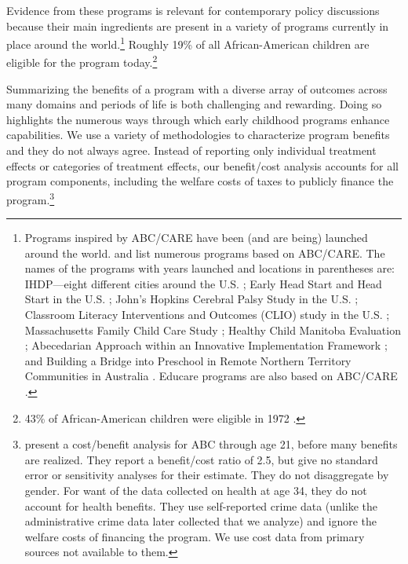 Evidence from these programs is relevant for contemporary policy discussions because their main ingredients are present in a variety of programs currently in place around the world.\footnote{Programs inspired by ABC/CARE have been (and are being) launched around the world. \citet{Sparling_2010_Highlights} and \citet{Ramey_Ramey_Lanzi_2014_Interventions} list numerous programs based on ABC/CARE. The names of the programs with years launched and locations in parentheses are: IHDP---eight different cities around the U.S. \citep{Spiker-etal_1997_Helping}; Early Head Start and Head Start in the U.S. \citep{Schneider_McDonald-eds_2007_Scale-Up_Vol-1}; John's Hopkins Cerebral Palsy Study in the U.S. \citep{Sparling_2010_Highlights}; Classroom Literacy Interventions and Outcomes (CLIO) study in the U.S. \citep{Sparling_2010_Highlights}; Massachusetts Family Child Care Study \citep{Collins_etal_2010_Massachusetts-Study}; Healthy Child Manitoba Evaluation \citep{Healthy_Child_Manitoba_2015_Starting-Early}; Abecedarian Approach within an Innovative Implementation Framework \citep{Jensen_Nielsen_2016_ABC-Programme-Pilot}; and Building a Bridge into Preschool in Remote Northern Territory Communities in Australia \citep{UMonash_Dataset_2015_URL}. Educare programs are also based on ABC/CARE \citep{Educare_2014_Research_Agenda,Yazejian_Bryant_2012_Educare}.} Roughly 19\% of all African-American children are eligible for the program today.\footnote{43\% of African-American children were eligible in 1972 \citep{Garcia_2016_National-Implementation-ECI}.}

Summarizing the benefits of a program with a diverse array of outcomes across many domains and periods of life is both challenging and rewarding. Doing so highlights the numerous ways through which early childhood programs enhance capabilities. We use a variety of methodologies to characterize program benefits and they do not always agree. Instead of reporting only individual treatment effects or categories of treatment effects, our benefit/cost analysis accounts for all program components, including the welfare costs of taxes to publicly finance the program.\footnote{\cite{Barnett_Masse_2002_benefitcost,Barnett_Masse_2007_EER} present a cost/benefit analysis for ABC through age 21, before many benefits are realized. They report a benefit/cost ratio of 2.5, but give no standard error or sensitivity analyses for their estimate. They do not disaggregate by gender. For want of the data collected on health at age 34, they do not account for health benefits. They use self-reported crime data (unlike the administrative crime data later collected that we analyze) and ignore the welfare costs of financing the program. We use cost data from primary sources not available to them.}

